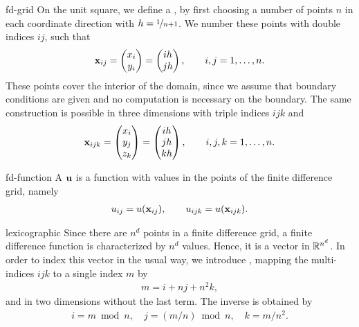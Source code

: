 \begin{Definition}{fd-grid}
  On the unit square, we define a , by
  first choosing a number of points $n$ in each coordinate direction
  with  $h = \nicefrac1{n+1}$. We number these points with
  double indices $ij$, such that
  \begin{gather}
    \mathbf x_{ij} =
    \begin{pmatrix}
      x_i\\y_i
    \end{pmatrix}
    =
    \begin{pmatrix}
      ih\\jh
    \end{pmatrix},
    \qquad i,j=1,\dots,n.
  \end{gather}
  These points cover the interior of the domain, since we assume that
  boundary conditions are given and no computation is necessary on the
  boundary. The same construction is possible in three dimensions with
  triple indices $ijk$ and
  \begin{gather}
    \mathbf x_{ijk} =
    \begin{pmatrix}
      x_i\\y_j\\z_k
    \end{pmatrix}
    =
    \begin{pmatrix}
      ih\\jh\\kh
    \end{pmatrix},
    \qquad i,j,k=1,\dots,n.
  \end{gather}  
\end{Definition}

\begin{Definition}{fd-function}
  A  $\mathbf u$ is a function with values in
  the points of the finite difference grid, namely
  \begin{gather}
    u_{ij} = u(\mathbf x_{ij}), \qquad u_{ijk} = u(\mathbf x_{ijk}).
  \end{gather}
\end{Definition}

\begin{Definition}{lexicographic}
  Since there are $n^d$ points in a finite difference grid, a finite
  difference function is characterized by $n^d$ values. Hence, it is a
  vector in $\mathbb R^{n^d}$. In order to index this vector in the usual
  way, we introduce , mapping the
  multi-indices $ijk$ to a single index $m$ by
  \begin{gather}
    m = i+nj+n^2k,
  \end{gather}
  and in two dimensions without the last term. The inverse is obtained by
  \begin{gather}
    i = m \bmod n,\quad j = (m/n) \bmod n,\quad k= m/n^2.
  \end{gather}
\end{Definition}

